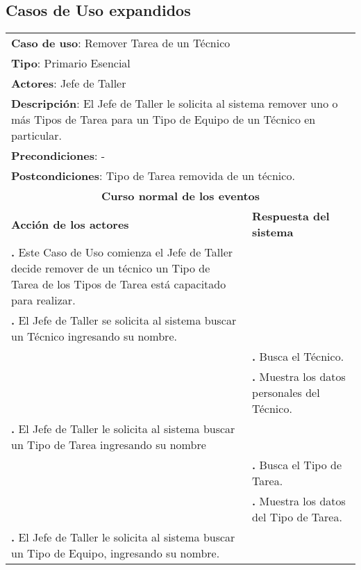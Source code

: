 \documentclass[12pt]{extarticle}
\begin{document}
    \subsection{Casos de Uso expandidos}

    \newcommand\inc{\stepcounter{step}\textbf{\thestep. }}
    \newcommand\resetinc{\setcounter{step}{0}}
    
    \newcommand\raya{\noindent\rule{169mm}{0.8mm}\\}

	\begin{longtable}{ |p{8cm}|p{8cm}| }
		\hline
		\multicolumn{2}{|p{16cm}|}{\textbf{Caso de uso}: Remover Tarea de un Técnico}\\
		\multicolumn{2}{|p{16cm}|}{\textbf{Tipo}: Primario Esencial}\\
		\multicolumn{2}{|p{16cm}|}{\textbf{Actores}: Jefe de Taller}\\
		\multicolumn{2}{|p{16cm}|}{\textbf{Descripción}: El Jefe de Taller le solicita al sistema remover uno o más Tipos de Tarea para un Tipo de Equipo de un Técnico en particular.}\\
		\multicolumn{2}{|p{16cm}|}{\textbf{Precondiciones}: - }\\
		\multicolumn{2}{|p{16cm}|}{\textbf{Postcondiciones}: Tipo de Tarea removida de un técnico.}\\
		\hline
		\multicolumn{2}{|c|}{\textbf{Curso normal de los eventos}}\\
		\hline
		\textbf{Acción de los actores} & \textbf{Respuesta del sistema}\\
		\hline
            \inc Este Caso de Uso comienza el Jefe de Taller decide remover de un técnico un Tipo de Tarea de los Tipos de Tarea está capacitado para realizar.& \\
			\hline
			\inc El Jefe de Taller se solicita al sistema buscar un Técnico ingresando su nombre. & \\
			\hline
			& \inc Busca el Técnico.\\
			\hline
			& \inc Muestra los datos personales del Técnico.\\
			\hline


			\inc El Jefe de Taller le solicita al sistema buscar un Tipo de Tarea ingresando su nombre & \\
			\hline
			& \inc Busca el Tipo de Tarea. \\
			\hline
			& \inc Muestra los datos del Tipo de Tarea. \\
			\hline
			\inc El Jefe de Taller le solicita al sistema buscar un Tipo de Equipo, ingresando su nombre.& \\
			\hline



\end{longtable}
\end{document}
